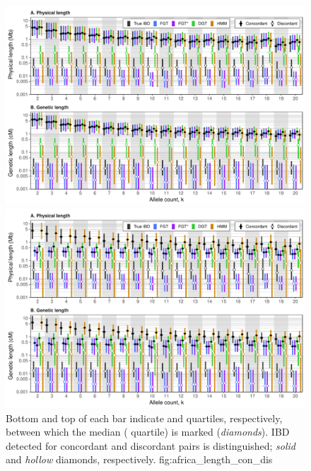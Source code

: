 

\begin{figure}[p]
{\smaller{}}\\
\includegraphics[width=\textwidth]{./img/ch5/africa_length_con_dis_tru}
{\smaller{}}\\
\includegraphics[width=\textwidth]{./img/ch5/africa_length_con_dis_err}
{Bottom and top of each bar indicate  and  quartiles, respectively, between which the median ( quartile) is marked (\emph{diamonds}).
IBD detected for concordant and discordant pairs is distinguished; \emph{solid} and \emph{hollow} diamonds, respectively.}
{fig:africa_length_con_dis}
\end{figure}

